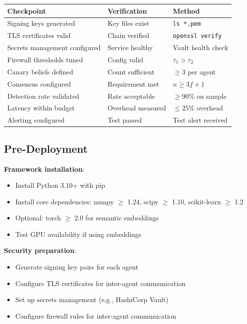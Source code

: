 \documentclass[
]{article}
\newcounter{none} %
\begin{document}
{\def\LTcaptype{none} %
\begin{longtable}[]{@{}lll@{}}
\toprule\noalign{}
Checkpoint & Verification & Method \\
\midrule\noalign{}
\endhead
\bottomrule\noalign{}
\endlastfoot
Signing keys generated & Key files exist & \texttt{ls\ *.pem} \\
TLS certificates valid & Chain verified & \texttt{openssl\ verify} \\
Secrets management configured & Service healthy & Vault health check \\
Firewall thresholds tuned & Config valid & \(\tau_1 > \tau_2\) \\
Canary beliefs defined & Count sufficient & \(\geq 3\) per agent \\
Consensus configured & Requirement met & \(n \geq 3f + 1\) \\
Detection rate validated & Rate acceptable & \(\geq 90\%\) on sample \\
Latency within budget & Overhead measured & \(\leq 25\%\) overhead \\
Alerting configured & Test passed & Test alert received \\
\end{longtable}
}

\subsection{Pre-Deployment}\label{sec:pre-deploy}

\textbf{Framework installation}:

\begin{itemize}
\item Install Python 3.10+ with pip
\item Install core dependencies: numpy $\geq$ 1.24, scipy $\geq$ 1.10, scikit-learn $\geq$ 1.2
\item Optional: torch $\geq$ 2.0 for semantic embeddings
\item Test GPU availability if using embeddings
\end{itemize}

\textbf{Security preparation}:

\begin{itemize}
\item Generate signing key pairs for each agent
\item Configure TLS certificates for inter-agent communication
\item Set up secrets management (e.g., HashiCorp Vault)
\item Configure firewall rules for inter-agent communication
\end{itemize}
\end{document}
